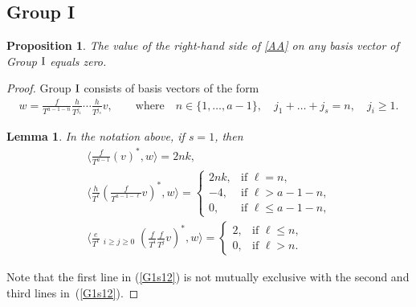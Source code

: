 \documentclass[pdftex]{sigma}
\numberwithin{equation}{section}
\newtheorem{lem}[thm]{Lemma}
\newtheorem{prop}[thm]{Proposition}
{\theoremstyle{definition}
\newtheorem*{rem}{Remark}}
\begin{document}
\subsection{Group I}
\begin{prop}\label{Pr3}The value of the right-hand side of \eqref{AA} on any basis vector of Group ${\rm I}$ equals zero.
\end{prop}
\begin{proof}Group ${\rm I}$ consists of basis vectors of the form
\begin{gather*}
w = \frac{f}{T^{a-1-n}}\frac{h}{T^{j_1}} \cdots \frac{h}{T^{j_s}} v, \qquad \text{where} \quad
n \in \{1, \dots, a-1 \},\quad j_1 + \dots + j_s = n, \quad j_i \geq 1.
\end{gather*}

\begin{lem}\label{Group 3, s=1} In the notation above, if $s =1$, then
\begin{gather}
\bigg\langle \frac{f}{T^{a-1}} (v)^*, w \bigg\rangle = 2 n k, \nonumber\\ %
\bigg\langle \frac{h}{T^{\ell}} \left(\frac{f}{T^{a-1-\ell}}v\right)^*, w \bigg\rangle = \begin{cases}
 2 n k, & \text{if $\ell=n$,}\\
 - 4, & \text{if $\ell > a-1-n$,} \\
 0, & \text{if $\ell \leq a-1-n$,}
 \end{cases} \label{G1s12}
\\
\bigg\langle \frac{e}{T^{\ell}} \mathop{\sum_{i+j=a-1-\ell}}_{i\geq j\geq 0} \left(\frac{f}{T^i}\frac{f}{T^j}v\right)^*, w \bigg\rangle =
 \begin{cases}
 2, & \text{if $\ell \leq n$,}\\
 0, & \text{if $\ell > n$. }
 \end{cases} \nonumber %
\end{gather}
\end{lem}

Note that the first line in (\ref{G1s12}) is not mutually exclusive with the second and third lines in~(\ref{G1s12}).


\end{proof}
\end{document}
